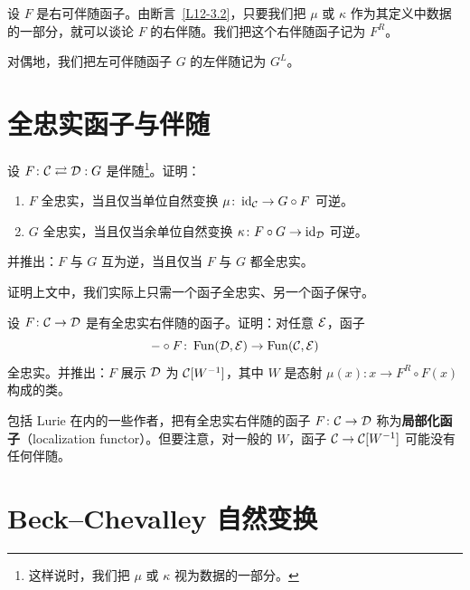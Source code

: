 \nitem\label{L12-3.10} 设 $F$ 是右可伴随函子。由断言~\ref{L12-3.2}，只要我们把 $\mu$ 或 $\kappa$ 作为其定义中数据的一部分，就可以谈论 $F$ 的右伴随。我们把这个右伴随函子记为 $F^{R}$。

对偶地，我们把左可伴随函子 $G$ 的左伴随记为 $G^{L}$。

\section{全忠实函子与伴随}

\begin{exercise}\label{L12-4.1}
设 $F\colon\mathcal{C}\rightleftarrows\mathcal{D}:G$ 是伴随\footnote{这样说时，我们把 $\mu$ 或 $\kappa$ 视为数据的一部分。}。证明：
\begin{enumerate}[label=(\arabic*),leftmargin=2.4em,itemsep=0.2em]
\item $F$ 全忠实，当且仅当单位自然变换 $\mu\colon\operatorname{id}_{\mathcal{C}}\to G\circ F$ 可逆。
\item $G$ 全忠实，当且仅当余单位自然变换 $\kappa\colon F\circ G\to\operatorname{id}_{\mathcal{D}}$ 可逆。
\end{enumerate}
并推出：$F$ 与 $G$ 互为逆，当且仅当 $F$ 与 $G$ 都全忠实。
\end{exercise}

\begin{exercise}\label{L12-4.2}
证明上文中，我们实际上只需一个函子全忠实、另一个函子保守。
\end{exercise}

\begin{exercise}\label{L12-4.3}
设 $F\colon\mathcal{C}\to\mathcal{D}$ 是有全忠实右伴随的函子。证明：对任意 $\mathcal{E}$，函子
\[
-\circ F\colon\operatorname{Fun}(\mathcal{D},\mathcal{E})\to\operatorname{Fun}(\mathcal{C},\mathcal{E})
\]
全忠实。并推出：$F$ 展示 $\mathcal{D}$ 为 $\mathcal{C}[W^{-1}]$，其中 $W$ 是态射 $\mu(x)\colon x\to F^{R}\circ F(x)$ 构成的类。
\end{exercise}

\begin{warning}\label{L12-4.4}
包括 Lurie 在内的一些作者，把有全忠实右伴随的函子 $F\colon\mathcal{C}\to\mathcal{D}$ 称为\textbf{局部化函子}（localization functor）。但要注意，对一般的 $W$，函子 $\mathcal{C}\to\mathcal{C}[W^{-1}]$ 可能没有任何伴随。
\end{warning}

\section{Beck–Chevalley 自然变换}

